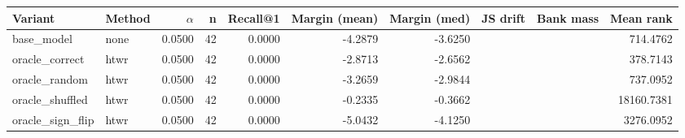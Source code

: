 \begin{tabular}{l l r r r r r r r r}
\toprule
Variant & Method & $\alpha$ & n & Recall@1 & Margin (mean) & Margin (med) & JS drift & Bank mass & Mean rank \\
\midrule
base\_model & none & 0.0500 & 42 & 0.0000 & -4.2879 & -3.6250 &  &  & 714.4762 \\
oracle\_correct & htwr & 0.0500 & 42 & 0.0000 & -2.8713 & -2.6562 &  &  & 378.7143 \\
oracle\_random & htwr & 0.0500 & 42 & 0.0000 & -3.2659 & -2.9844 &  &  & 737.0952 \\
oracle\_shuffled & htwr & 0.0500 & 42 & 0.0000 & -0.2335 & -0.3662 &  &  & 18160.7381 \\
oracle\_sign\_flip & htwr & 0.0500 & 42 & 0.0000 & -5.0432 & -4.1250 &  &  & 3276.0952 \\
\bottomrule
\end{tabular}
